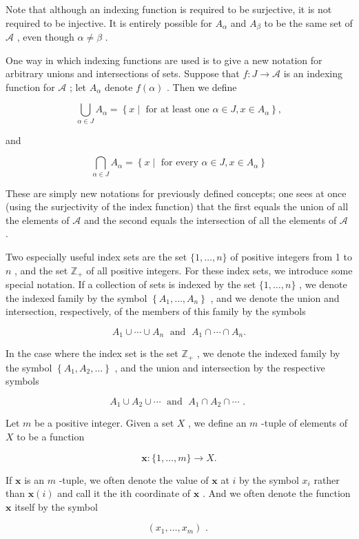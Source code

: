 Note that although an indexing function is required to be surjective, it is not required to be injective. It is entirely possible for \({A}_{\alpha }\) and \({A}_{\beta }\) to be the same set of \(\mathcal{A}\) , even though \(\alpha  \neq  \beta\) .


One way in which indexing functions are used is to give a new notation for arbitrary unions and intersections of sets. Suppose that \(f : J \rightarrow  \mathcal{A}\) is an indexing function for \(\mathcal{A}\) ; let \({A}_{\alpha }\) denote \(f\left( \alpha \right)\) . Then we define

\[
\mathop{\bigcup }\limits_{{\alpha  \in  J}}{A}_{\alpha } = \left\{  {x \mid  \text{ for at least one }\alpha  \in  J,x \in  {A}_{\alpha }}\right\}  ,
\]

and

\[
\mathop{\bigcap }\limits_{{\alpha  \in  J}}{A}_{\alpha } = \left\{  {x \mid  \text{ for every }\alpha  \in  J,x \in  {A}_{\alpha }}\right\}
\]

These are simply new notations for previously defined concepts; one sees at once (using the surjectivity of the index function) that the first equals the union of all the elements of \(\mathcal{A}\) and the second equals the intersection of all the elements of \(\mathcal{A}\) .

Two especially useful index sets are the set \(\{ 1,\ldots ,n\}\) of positive integers from 1 to \(n\) , and the set \({\mathbb{Z}}_{ + }\) of all positive integers. For these index sets, we introduce some special notation. If a collection of sets is indexed by the set \(\{ 1,\ldots ,n\}\) , we denote the indexed family by the symbol \(\left\{  {{A}_{1},\ldots ,{A}_{n}}\right\}\) , and we denote the union and intersection, respectively, of the members of this family by the symbols

\[
{A}_{1} \cup  \cdots  \cup  {A}_{n}\;\text{ and }\;{A}_{1} \cap  \cdots  \cap  {A}_{n}.
\]

In the case where the index set is the set \({\mathbb{Z}}_{ + }\) , we denote the indexed family by the symbol \(\left\{  {{A}_{1},{A}_{2},\ldots }\right\}\) , and the union and intersection by the respective symbols

\[
{A}_{1} \cup  {A}_{2} \cup  \cdots \;\text{ and }\;{A}_{1} \cap  {A}_{2} \cap  \cdots \text{ . }
\]

\begin{definition} Let \(m\) be a positive integer. Given a set \(X\) , we define an \(m\) -tuple of elements of \(X\) to be a function

\[
\mathbf{x} : \{ 1,\ldots ,m\}  \rightarrow  X.
\]

If \(\mathbf{x}\) is an \(m\) -tuple, we often denote the value of \(\mathbf{x}\) at \(i\) by the symbol \({x}_{i}\) rather than \(\mathbf{x}\left( i\right)\) and call it the ith coordinate of \(\mathbf{x}\) . And we often denote the function \(\mathbf{x}\) itself by the symbol

\[
\left( {{x}_{1},\ldots ,{x}_{m}}\right) \text{ . }
\]
\end{definition}


